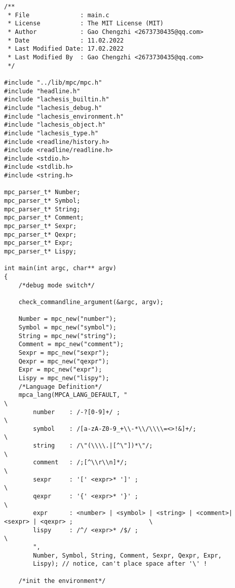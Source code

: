 \documentclass[UTF8]{ctexart}
\begin{document}
\begin{lstlisting}
/**
 * File              : main.c
 * License           : The MIT License (MIT)
 * Author            : Gao Chengzhi <2673730435@qq.com>
 * Date              : 11.02.2022
 * Last Modified Date: 17.02.2022
 * Last Modified By  : Gao Chengzhi <2673730435@qq.com>
 */

#include "../lib/mpc/mpc.h"
#include "headline.h"
#include "lachesis_builtin.h"
#include "lachesis_debug.h"
#include "lachesis_environment.h"
#include "lachesis_object.h"
#include "lachesis_type.h"
#include <readline/history.h>
#include <readline/readline.h>
#include <stdio.h>
#include <stdlib.h>
#include <string.h>

mpc_parser_t* Number;
mpc_parser_t* Symbol;
mpc_parser_t* String;
mpc_parser_t* Comment;
mpc_parser_t* Sexpr;
mpc_parser_t* Qexpr;
mpc_parser_t* Expr;
mpc_parser_t* Lispy;

int main(int argc, char** argv)
{
    /*debug mode switch*/

    check_commandline_argument(&argc, argv);

    Number = mpc_new("number");
    Symbol = mpc_new("symbol");
    String = mpc_new("string");
    Comment = mpc_new("comment");
    Sexpr = mpc_new("sexpr");
    Qexpr = mpc_new("qexpr");
    Expr = mpc_new("expr");
    Lispy = mpc_new("lispy");
    /*Language Definition*/
    mpca_lang(MPCA_LANG_DEFAULT, "                                      \
        number    : /-?[0-9]+/ ;                                        \
        symbol    : /[a-zA-Z0-9_+\\-*\\/\\\\=<>!&]+/;                   \
        string    : /\"(\\\\.|[^\"])*\"/;                               \
        comment   : /;[^\\r\\n]*/;                                      \
        sexpr     : '[' <expr>* ']' ;                                   \
        qexpr     : '{' <expr>* '}' ;                                   \
        expr      : <number> | <symbol> | <string> | <comment>| <sexpr> | <qexpr> ;                     \
        lispy     : /^/ <expr>* /$/ ;                                   \
        ",
        Number, Symbol, String, Comment, Sexpr, Qexpr, Expr,
        Lispy); // notice, can't place space after '\' !

    /*init the environment*/


\end{lstlisting}
\end{document}
